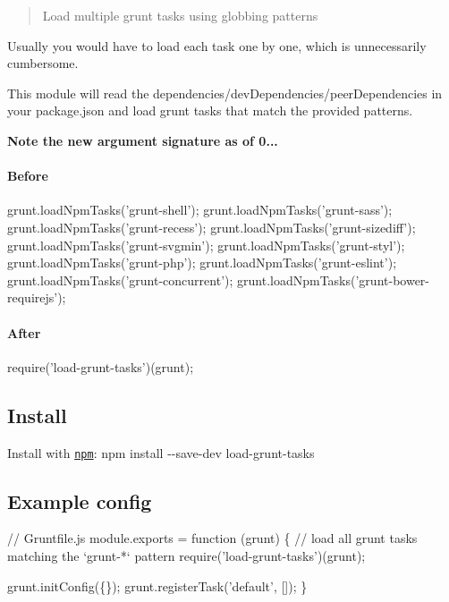 \begin{quote}
Load multiple grunt tasks using globbing patterns \end{quote}


Usually you would have to load each task one by one, which is unnecessarily cumbersome.

This module will read the {\ttfamily dependencies}/{\ttfamily dev\+Dependencies}/{\ttfamily peer\+Dependencies} in your package.\+json and load grunt tasks that match the provided patterns.

{\bfseries Note the new argument signature as of 0...}

\paragraph*{Before}


\begin{DoxyCode}
grunt.loadNpmTasks('grunt-shell');
grunt.loadNpmTasks('grunt-sass');
grunt.loadNpmTasks('grunt-recess');
grunt.loadNpmTasks('grunt-sizediff');
grunt.loadNpmTasks('grunt-svgmin');
grunt.loadNpmTasks('grunt-styl');
grunt.loadNpmTasks('grunt-php');
grunt.loadNpmTasks('grunt-eslint');
grunt.loadNpmTasks('grunt-concurrent');
grunt.loadNpmTasks('grunt-bower-requirejs');
\end{DoxyCode}


\paragraph*{After}


\begin{DoxyCode}
require('load-grunt-tasks')(grunt);
\end{DoxyCode}


\subsection*{Install}

Install with \href{https://npmjs.org/package/load-grunt-tasks}{\tt npm}\+: {\ttfamily npm install -\/-\/save-\/dev load-\/grunt-\/tasks}

\subsection*{Example config}


\begin{DoxyCode}
// Gruntfile.js
module.exports = function (grunt) \{
    // load all grunt tasks matching the `grunt-*` pattern
    require('load-grunt-tasks')(grunt);

    grunt.initConfig(\{\});
    grunt.registerTask('default', []);
\}
\end{DoxyCode}


